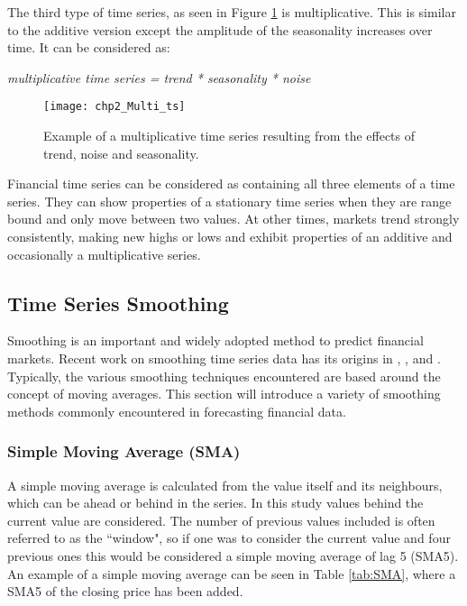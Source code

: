 The third type of time series, as seen in Figure \ref{fig:Multi_ts} is multiplicative. This is similar to the additive version except the amplitude of the seasonality increases over time. It can be considered as:

\begin{center}
\textit{multiplicative time series = trend * seasonality * noise}
\end{center}

\begin{figure}[tbph!]
\centering
\texttt{[image: chp2\_Multi\_ts]}
\caption[Multiplicative time series]{Example of a multiplicative time series resulting from the effects of trend, noise and seasonality.}
\label{fig:Multi_ts}
\end{figure}

Financial time series can be considered as containing all three elements of a time series. They can show properties of a stationary time series when they are range bound and only move between two values. At other times, markets trend strongly consistently, making new highs or lows and exhibit properties of an additive and occasionally a multiplicative series.

\subsection{Time Series Smoothing}
\label{sec:expsmoothing}
Smoothing is an important and widely adopted method to predict financial markets.  Recent work on smoothing time series data has its origins in \cite{brown1959statistical}, \cite{brown1963statistical}, \cite{Holt20045} and \cite{Winters1960}. Typically, the various smoothing techniques encountered are based around the concept of moving averages. This section will introduce a variety of smoothing methods commonly encountered in forecasting financial data. 

\subsubsection{Simple Moving Average (SMA)}
\label{sec:chp2_sma}
A simple moving average is calculated from the value itself and its neighbours, which can be ahead or behind in the series. In this study values behind the current value are considered. The number of previous values included is often referred to as the \textquotedblleft window", so if one was to consider the current value and four previous ones this would be considered a simple moving average of lag 5 (SMA5). An example of a simple moving average can be seen in Table \ref{tab:SMA}, where a SMA5 of the closing price has been added.

